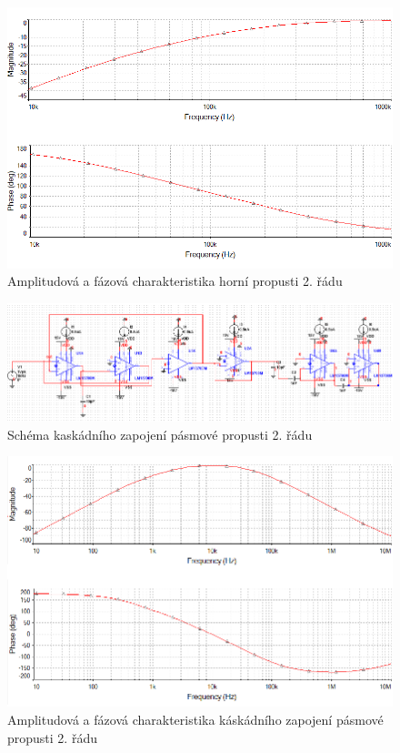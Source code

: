 \documentclass[twoside]{article}
\begin{document}
\begin{figure}[H]
\centering
\includegraphics[scale=0.6]{16063.png}
\caption{Amplitudová a fázová charakteristika horní propusti 2. řádu}
\end{figure}
\begin{figure}[H]
\centering
\includegraphics[scale=0.6]{lrcbandpass.png}
\caption{Schéma kaskádního zapojení pásmové propusti 2. řádu}
\end{figure}
\begin{figure}[H]
\centering
\includegraphics[scale=0.6]{lrcbandpassampl.png}
\caption{Amplitudová a fázová charakteristika káskádního zapojení pásmové propusti 2. řádu}
\end{figure}
\end{document}

